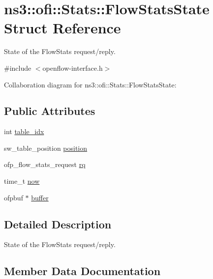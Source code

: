 \hypertarget{structns3_1_1ofi_1_1Stats_1_1FlowStatsState}{}\section{ns3\+:\+:ofi\+:\+:Stats\+:\+:Flow\+Stats\+State Struct Reference}
\label{structns3_1_1ofi_1_1Stats_1_1FlowStatsState}


State of the Flow\+Stats request/reply.  




{\ttfamily \#include $<$openflow-\/interface.\+h$>$}



Collaboration diagram for ns3\+:\+:ofi\+:\+:Stats\+:\+:Flow\+Stats\+State\+:
\subsection*{Public Attributes}
\begin{DoxyCompactItemize}
\item 
int \hyperlink{structns3_1_1ofi_1_1Stats_1_1FlowStatsState_afee8c219ff60bac538dad0452c6bb75e}{table\+\_\+idx}
\item 
sw\+\_\+table\+\_\+position \hyperlink{structns3_1_1ofi_1_1Stats_1_1FlowStatsState_ae3bbc1e3369c0398de8591083b9e210f}{position}
\item 
ofp\+\_\+flow\+\_\+stats\+\_\+request \hyperlink{structns3_1_1ofi_1_1Stats_1_1FlowStatsState_a6fe4ba4a6a59523bd5667190df144d25}{rq}
\item 
time\+\_\+t \hyperlink{structns3_1_1ofi_1_1Stats_1_1FlowStatsState_a340a156f2cbd9577a60c0c49380f30c1}{now}
\item 
ofpbuf $\ast$ \hyperlink{structns3_1_1ofi_1_1Stats_1_1FlowStatsState_a7f9f8b287363100de9105045286c4f3f}{buffer}
\end{DoxyCompactItemize}


\subsection{Detailed Description}
State of the Flow\+Stats request/reply. 

\subsection{Member Data Documentation}
